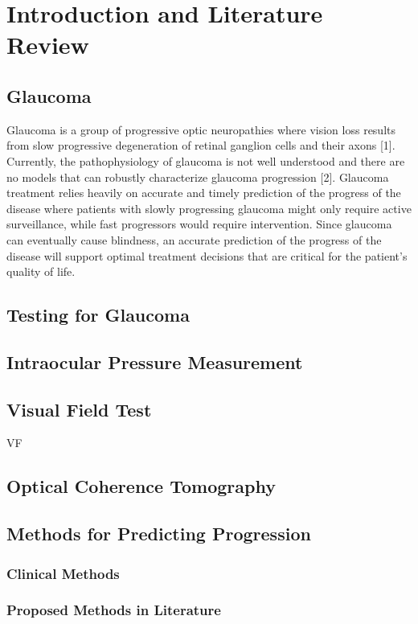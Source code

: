 \chapter{Introduction and Literature Review}

\section{Glaucoma}

Glaucoma is a group of progressive optic neuropathies where vision loss results from slow progressive degeneration of retinal ganglion cells and their axons [1]. Currently, the pathophysiology of glaucoma is not well understood and there are no models that can robustly characterize glaucoma progression [2]. Glaucoma treatment relies heavily on accurate and timely prediction of the progress of the disease where patients with slowly progressing glaucoma might only require active surveillance, while fast progressors would require intervention. Since glaucoma can eventually cause blindness, an accurate prediction of the progress of the disease will support optimal treatment decisions that are critical for the patient’s quality of life.  

\section{Testing for Glaucoma}

\section{Intraocular Pressure Measurement}

\section{Visual Field Test}

\ac{VF}

\section{Optical Coherence Tomography}

\section{Methods for Predicting Progression}

\subsection{Clinical Methods}

\subsection{Proposed Methods in Literature}
